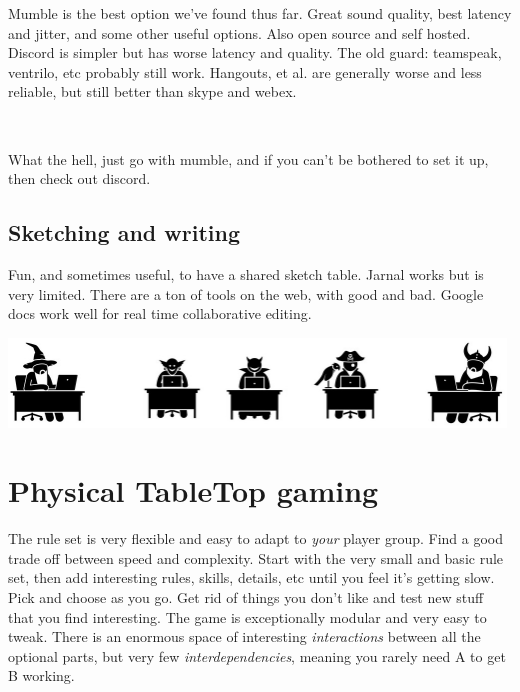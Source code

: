 Mumble is the best option we've found thus far. Great sound quality, best latency and jitter, and some other useful options. Also open source and self hosted. Discord is simpler but has worse latency and quality. The old guard: teamspeak, ventrilo, etc probably still work. Hangouts, et al. are generally worse and less reliable, but still better than skype and webex.

\

What the hell, just go with mumble, and if you can't be bothered to set it up, then check out discord.


\subsection*{Sketching and writing} 

Fun, and sometimes useful, to have a shared sketch table. Jarnal works but is very limited. There are a ton of tools on the web, with good and bad. Google docs work well for real time collaborative editing.


\vfill

\begin{center}
\includegraphics[width=0.99\textwidth]{./fig/online-warriors.png}
\end{center}








\clearpage %

\section*{Physical TableTop gaming}

The rule set is very flexible and easy to adapt to \emph{your} player group. Find a good trade off between speed and complexity. Start with the very small and basic rule set, then add interesting rules, skills, details, etc until you feel it's getting slow. Pick and choose as you go. Get rid of things you don't like and test new stuff that you find interesting. The game is exceptionally modular and very easy to tweak. There is an enormous space of interesting \emph{interactions} between all the optional parts, but very few \emph{interdependencies}, meaning you rarely need A to get B working.


